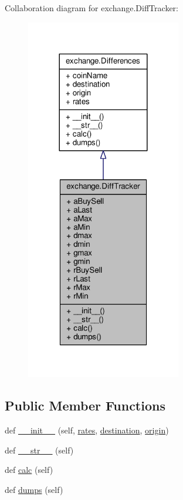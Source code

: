 Collaboration diagram for exchange.\+Diff\+Tracker\+:\nopagebreak
\begin{figure}[H]
\begin{center}
\leavevmode
\includegraphics[width=192pt]{classexchange_1_1_diff_tracker__coll__graph}
\end{center}
\end{figure}
\subsection*{Public Member Functions}
\begin{DoxyCompactItemize}
\item 
def \hyperlink{classexchange_1_1_diff_tracker_ab9d1d8ef6d877d209ace871e195b284c}{\+\_\+\+\_\+init\+\_\+\+\_\+} (self, \hyperlink{classexchange_1_1_differences_a821ecbc04dae3081f634a28d377c69c3}{rates}, \hyperlink{classexchange_1_1_differences_a0092f9963e867db55e7ea2f0bab1b07e}{destination}, \hyperlink{classexchange_1_1_differences_a25acbe37294f8b4eb5bf909cd84a0b9d}{origin})
\item 
def \hyperlink{classexchange_1_1_diff_tracker_a72214c03506722b0554e433615bff766}{\+\_\+\+\_\+str\+\_\+\+\_\+} (self)
\item 
def \hyperlink{classexchange_1_1_diff_tracker_a5289683bd2bd43e75e0062704df53736}{calc} (self)
\item 
def \hyperlink{classexchange_1_1_diff_tracker_aa3c9d92dbe7c7fcf25959fe55c6ba47d}{dumps} (self)
\end{DoxyCompactItemize}
